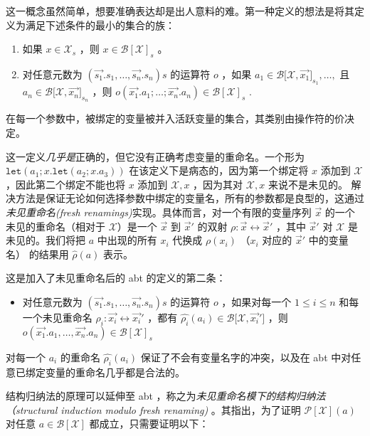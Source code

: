 这一概念虽然简单，想要准确表达却是出人意料的难。第一种定义的想法是将其定义为满足下述条件的最小的集合的族：

\begin{enumerate}
\def\labelenumi{\arabic{enumi}.}
\item
  如果 \(x\in \mathcal{X}_s\) ，则 \(x \in \mathcal{B[X]}_s\) 。
\item
  对任意元数为 \((\vec{s_1}.s_1,\dots,\vec{s_n}.s_n)s\) 的运算符 \(o\)
  ，如果 \(a_1\in \mathcal{B[X},\vec{x_1}]_{s_1},\dots,\) 且
  \(a_n\in \mathcal{B[X},\vec{x_n}]_{s_n}\) ，则
  \(o(\vec{x_1}.a_1;\dots;\vec{x_n}.a_n)\in \mathcal{B[X]}_s\) .
\end{enumerate}

在每一个参数中，被绑定的变量被并入活跃变量的集合，其类别由操作符的价决定。

这一定义\emph{几乎是}正确的，但它没有正确考虑变量的重命名。一个形为
\(\texttt{let}(a_1;x.\texttt{let}(a_2;x.a_3))\)
在该定义下是病态的，因为第一个绑定将 \(x\) 添加到 \(\mathcal{X}\)
，因此第二个绑定不能也将 \(x\) 添加到 \(\mathcal{X},x\) ，因为其对
\(\mathcal{X},x\) 来说不是未见的。
解决方法是保证无论如何选择参数中绑定的变量名，所有的参数都是良型的，这通过\emph{未见重命名(fresh
renamings)}实现。具体而言，对一个有限的变量序列 \(\vec{x}\)
的一个未见的重命名（相对于 \(\mathcal{X}\)）是一个 \(\vec{x}\) 到
\(\vec{x}'\) 的双射 \(\rho : \vec{x} \leftrightarrow \vec{x}'\) ，其中
\(\vec{x}'\) 对 \(\mathcal{X}\) 是未见的。我们将把 \(a\) 中出现的所有
\(x_i\) 代换成 \(\rho(x_i)\) （\(x_i\) 对应的 \(\vec{x}'\) 中的变量名）
的结果用 \(\hat{\rho}(a)\) 表示。

这是加入了未见重命名后的 abt 的定义的第二条：

\begin{itemize}
\item
  对任意元数为 \((\vec{s_1}.s_1,\dots,\vec{s_n}.s_n)s\) 的运算符 \(o\)
  ，如果对每一个 \(1 \leq i \leq n\) 和每一个未见重命名
  \(\rho_i:\vec{x_i}\leftrightarrow \vec{x_i}'\) ，都有
  \(\hat{\rho_i}(a_i)\in \mathcal{B[X},\vec{x_i}']\) ，则
  \(o(\vec{x_1}.a_1,\dots,\vec{x_n}.a_n)\in \mathcal{B[X]}_s\)
\end{itemize}

对每一个 \(a_i\) 的重命名 \(\hat{\rho_i}(a_i)\)
保证了不会有变量名字的冲突，以及在 abt
中对任意已绑定变量的重命名几乎都是合法的。

结构归纳法的原理可以延伸至 abt
，称之为\emph{未见重命名模下的结构归纳法（structural induction modulo
fresh renaming)} 。其指出，为了证明 \(\mathcal{P[X]}(a)\) 对任意
\(a\in \mathcal{B[X]}\) 都成立，只需要证明以下：

